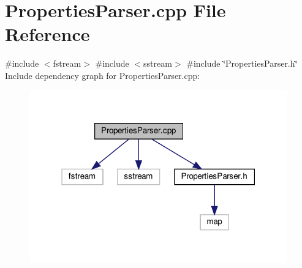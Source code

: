 \section{Properties\+Parser.\+cpp File Reference}
\label{_properties_parser_8cpp}
{\ttfamily \#include $<$fstream$>$}\newline
{\ttfamily \#include $<$sstream$>$}\newline
{\ttfamily \#include \char`\"{}Properties\+Parser.\+h\char`\"{}}\newline
Include dependency graph for Properties\+Parser.\+cpp\+:\nopagebreak
\begin{figure}[H]
\begin{center}
\leavevmode
\includegraphics[width=316pt]{_properties_parser_8cpp__incl}
\end{center}
\end{figure}
